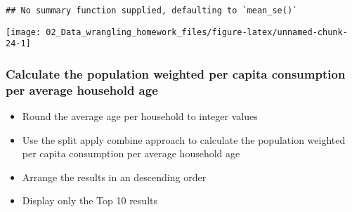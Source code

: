\documentclass[
]{article}
\newenvironment{Shaded}{\begin{snugshade}}{\end{snugshade}}
\newcommand{\DataTypeTok}[1]{\textcolor[rgb]{0.13,0.29,0.53}{#1}}
\newcommand{\DecValTok}[1]{\textcolor[rgb]{0.00,0.00,0.81}{#1}}
\newcommand{\KeywordTok}[1]{\textcolor[rgb]{0.13,0.29,0.53}{\textbf{#1}}}
\newcommand{\NormalTok}[1]{#1}
\newcommand{\OperatorTok}[1]{\textcolor[rgb]{0.81,0.36,0.00}{\textbf{#1}}}
\newcommand{\StringTok}[1]{\textcolor[rgb]{0.31,0.60,0.02}{#1}}
\providecommand{\tightlist}{%
  \setlength{\itemsep}{0pt}\setlength{\parskip}{0pt}}
\begin{document}
\begin{verbatim}
## No summary function supplied, defaulting to `mean_se()`
\end{verbatim}

\begin{center}\texttt{[image: 02\_Data\_wrangling\_homework\_files/figure-latex/unnamed-chunk-24-1]} \end{center}

\hypertarget{calculate-the-population-weighted-per-capita-consumption-per-average-household-age}{%
\subsubsection{Calculate the population weighted per capita consumption
per average household
age}\label{calculate-the-population-weighted-per-capita-consumption-per-average-household-age}}

\begin{itemize}
\tightlist
\item
  Round the average age per household to integer values
\item
  Use the split apply combine approach to calculate the population
  weighted per capita consumption per average household age
\item
  Arrange the results in an descending order
\item
  Display only the Top 10 results
\end{itemize}

\begin{Shaded}
\end{Shaded}
\end{document}
